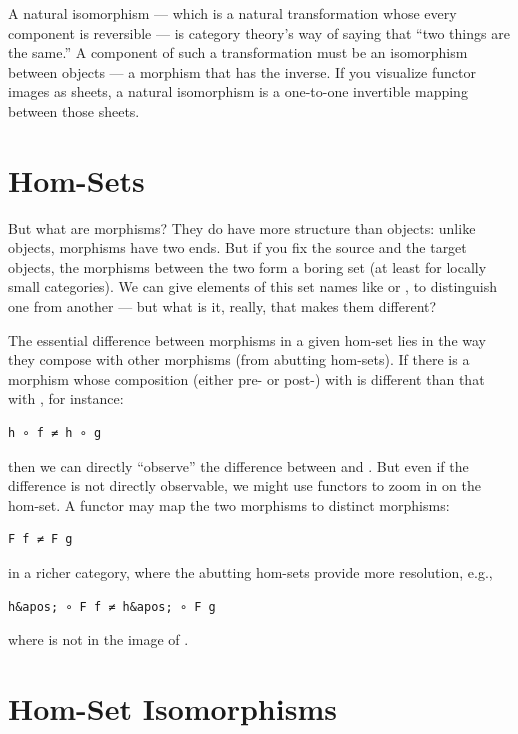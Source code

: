 A natural isomorphism --- which is a natural transformation whose every
component is reversible --- is category theory's way of saying that
``two things are the same.'' A component of such a transformation must
be an isomorphism between objects --- a morphism that has the inverse.
If you visualize functor images as sheets, a natural isomorphism is a
one-to-one invertible mapping between those sheets.

\section{Hom-Sets}\label{hom-sets}

But what are morphisms? They do have more structure than objects: unlike
objects, morphisms have two ends. But if you fix the source and the
target objects, the morphisms between the two form a boring set (at
least for locally small categories). We can give elements of this set
names like  or , to distinguish one from another ---
but what is it, really, that makes them different?

The essential difference between morphisms in a given hom-set lies in
the way they compose with other morphisms (from abutting hom-sets). If
there is a morphism  whose composition (either pre- or post-)
with  is different than that with , for instance:

\begin{verbatim}
h ∘ f ≠ h ∘ g
\end{verbatim}

then we can directly ``observe'' the difference between  and
. But even if the difference is not directly observable, we
might use functors to zoom in on the hom-set. A functor  may
map the two morphisms to distinct morphisms:

\begin{verbatim}
F f ≠ F g
\end{verbatim}

in a richer category, where the abutting hom-sets provide more
resolution, e.g.,

\begin{verbatim}
h&apos; ∘ F f ≠ h&apos; ∘ F g
\end{verbatim}

where  is not in the image of .

\section{Hom-Set Isomorphisms}\label{hom-set-isomorphisms}

